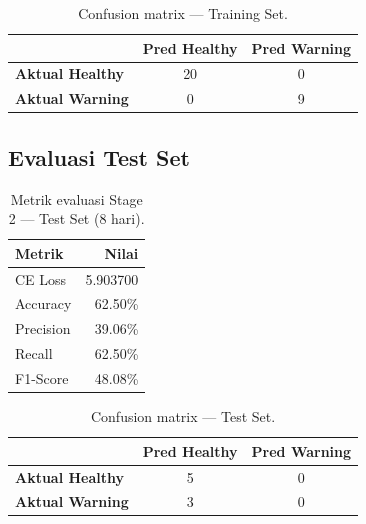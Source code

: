 \documentclass[11pt,a4paper]{article}
\begin{document}
\begin{table}[H]
    \centering
    \caption{Confusion matrix — Training Set.}
    \begin{tabular}{lcc}
        \toprule
         & \textbf{Pred Healthy} & \textbf{Pred Warning} \\
        \midrule
        \textbf{Aktual Healthy} & 20 & 0 \\
        \textbf{Aktual Warning} & 0  & 9 \\
        \bottomrule
    \end{tabular}
\end{table}

\subsection{Evaluasi Test Set}
\begin{table}[H]
    \centering
    \caption{Metrik evaluasi Stage 2 — Test Set (8 hari).}
    \begin{tabular}{lr}
        \toprule
        \textbf{Metrik} & \textbf{Nilai} \\
        \midrule
        CE Loss   & 5.903700 \\
        Accuracy  & 62.50\% \\
        Precision & 39.06\% \\
        Recall    & 62.50\% \\
        F1-Score  & 48.08\% \\
        \bottomrule
    \end{tabular}
\end{table}

\begin{table}[H]
    \centering
    \caption{Confusion matrix — Test Set.}
    \begin{tabular}{lcc}
        \toprule
         & \textbf{Pred Healthy} & \textbf{Pred Warning} \\
        \midrule
        \textbf{Aktual Healthy} & 5 & 0 \\
        \textbf{Aktual Warning} & 3 & 0 \\
        \bottomrule
    \end{tabular}
\end{table}
\end{document}
